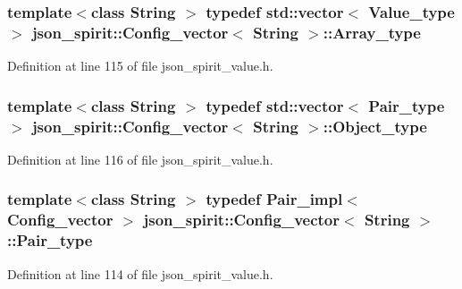 \subsubsection[{Array\+\_\+type}]{\setlength{\rightskip}{0pt plus 5cm}template$<$class String $>$ typedef std\+::vector$<$ {\bf Value\+\_\+type} $>$ {\bf json\+\_\+spirit\+::\+Config\+\_\+vector}$<$ String $>$\+::{\bf Array\+\_\+type}}\label{structjson__spirit_1_1_config__vector_af33059c26ec27a5153b53dd4bd312815}


Definition at line 115 of file json\+\_\+spirit\+\_\+value.\+h.

\hypertarget{structjson__spirit_1_1_config__vector_a070c3d1a0aea6da7c24a60400d52f15d}{}
\subsubsection[{Object\+\_\+type}]{\setlength{\rightskip}{0pt plus 5cm}template$<$class String $>$ typedef std\+::vector$<$ {\bf Pair\+\_\+type} $>$ {\bf json\+\_\+spirit\+::\+Config\+\_\+vector}$<$ String $>$\+::{\bf Object\+\_\+type}}\label{structjson__spirit_1_1_config__vector_a070c3d1a0aea6da7c24a60400d52f15d}


Definition at line 116 of file json\+\_\+spirit\+\_\+value.\+h.

\hypertarget{structjson__spirit_1_1_config__vector_ae65b82636d991e02baba4eb5ddfbd0d1}{}
\subsubsection[{Pair\+\_\+type}]{\setlength{\rightskip}{0pt plus 5cm}template$<$class String $>$ typedef {\bf Pair\+\_\+impl}$<$ {\bf Config\+\_\+vector} $>$ {\bf json\+\_\+spirit\+::\+Config\+\_\+vector}$<$ String $>$\+::{\bf Pair\+\_\+type}}\label{structjson__spirit_1_1_config__vector_ae65b82636d991e02baba4eb5ddfbd0d1}


Definition at line 114 of file json\+\_\+spirit\+\_\+value.\+h.

\hypertarget{structjson__spirit_1_1_config__vector_a9f0a96da6042290c5bc25c1b3269e747}{}
